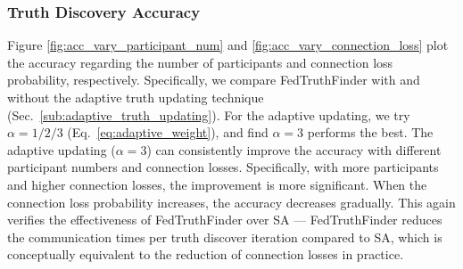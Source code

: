 \subsubsection{Truth Discovery Accuracy} Figure \ref{fig:acc_vary_participant_num} and \ref{fig:acc_vary_connection_loss} plot the accuracy regarding the number of participants and connection loss probability, respectively. Specifically, we compare FedTruthFinder with and without the adaptive truth updating technique (Sec.~\ref{sub:adaptive_truth_updating}). For the adaptive updating, we try $\alpha=1/2/3$ (Eq.~\ref{eq:adaptive_weight}), and find $\alpha=3$ performs the best. The adaptive updating ($\alpha=3$) can consistently improve the accuracy with different participant numbers and connection losses. Specifically, with more participants and higher connection losses, the improvement is more significant. When the connection loss probability increases, the accuracy decreases gradually. This again verifies the effectiveness of FedTruthFinder over SA \citep{Xu2019EfficientAP} --- FedTruthFinder reduces the communication times per truth discover iteration compared to SA, which is conceptually equivalent to the reduction of connection losses in practice.


